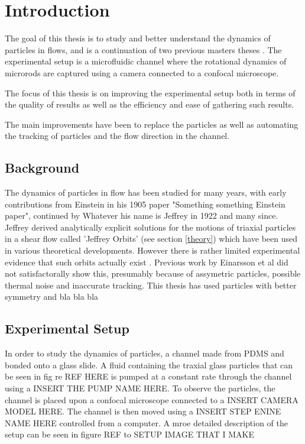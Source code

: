 \documentclass[]{report}
\title{}
\author{}
\begin{document}
\maketitle

\begin{abstract}

\end{abstract}

\chapter{Introduction}
The goal of this thesis is to study and better understand the dynamics of particles in flows, and is a continuation of two previous masters theses \cite{AntonExjobb}\cite{JonasExjobb}. The experimental setup is a microfluidic channel where the rotational dynamics of microrods are captured using a camera connected to a confocal microscope. 

The focus of this thesis is on improving the experimental setup both in terms of the quality of results as well as the efficiency and ease of gathering such results.

The main improvements have been to replace the particles as well as automating the tracking of particles and the flow direction in the channel.

\section{Background}
The dynamics of particles in flow has been studied for many years, with early contributions from Einstein in his 1905 paper "Something something Einstein paper"\cite{EinsteinsPaper}, continued by Whatever his name is Jeffrey in 1922 and many since. Jeffrey derived analytically explicit solutions for the motions of triaxial particles in a shear flow called 'Jeffrey Orbits' (see section \ref{theory}) which have been used in various theoretical developments. However there is rather limited experimental evidence that such orbits actually exist \cite{IReallyWantACiteHere}. Previous work by Einarsson\cite{EinarssonsPaper} et al did not satisfactorally show this, presumably because of assymetric particles, possible thermal noise and inaccurate tracking. This thesis has used particles with better symmetry and bla bla bla

\section{Experimental Setup}
In order to study the dynamics of particles, a channel made from PDMS and bonded onto a glass slide. A fluid containing the traxial glass particles that can be seen in fig re REF HERE is pumped at a constant rate through the channel using a INSERT THE PUMP NAME HERE. To observe the particles, the channel is placed upon a confocal microscope connected to a INSERT CAMERA MODEL HERE. The channel is then moved using a INSERT STEP ENINE NAME HERE controlled from a computer. A mroe detailed description of the setup can be seen in figure REF to SETUP IMAGE THAT I MAKE
\end{document}
